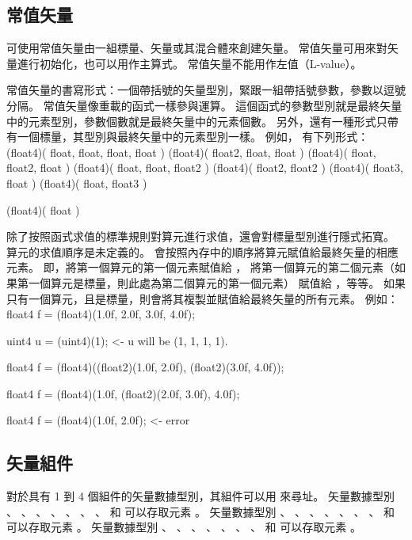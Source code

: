 \subsection{常值矢量}

可使用常值矢量由一組標量、矢量或其混合體來創建矢量。
常值矢量可用來對矢量進行初始化，也可以用作主算式。
常值矢量不能用作左值（L-value）。

常值矢量的書寫形式：一個帶括號的矢量型別，緊跟一組帶括號參數，參數以逗號分隔。
常值矢量像重載的函式一樣參與運算。
這個函式的參數型別就是最終矢量中的元素型別，參數個數就是最終矢量中的元素個數。
另外，還有一種形式只帶有一個標量，其型別與最終矢量中的元素型別一樣。
例如，  有下列形式：
\startclc
(float4)( float, float, float, float )
(float4)( float2, float, float )
(float4)( float, float2, float )
(float4)( float, float, float2 )
(float4)( float2, float2 )
(float4)( float3, float )
(float4)( float, float3 )

(float4)( float )
\stopclc

除了按照函式求值的標準規則對算元進行求值，還會對標量型別進行隱式拓寬。
算元的求值順序是未定義的。
會按照內存中的順序將算元賦值給最終矢量的相應元素。
即，將第一個算元的第一個元素賦值給 ，
將第一個算元的第二個元素（如果第一個算元是標量，則此處為第二個算元的第一個元素）
賦值給 ，等等。
如果只有一個算元，且是標量，則會將其複製並賦值給最終矢量的所有元素。
例如：
\startclc
float4	f = (float4)(1.0f, 2.0f, 3.0f, 4.0f);

uint4	u = (uint4)(1);		<- u will be (1, 1, 1, 1).

float4	f = (float4)((float2)(1.0f, 2.0f),
		     (float2)(3.0f, 4.0f));

float4	f = (float4)(1.0f, (float2)(2.0f, 3.0f), 4.0f);

float4	f = (float4)(1.0f, 2.0f);	<- error
\stopclc

\subsection{矢量組件}

對於具有 1 到 4 個組件的矢量數據型別，其組件可以用  來尋址。
矢量數據型別 、 、 、 、
 、 、 、  和 
 可以存取元素 。
矢量數據型別 、 、 、 、
 、 、 、  和 
 可以存取元素 。
矢量數據型別 、 、 、 、
 、 、 、  和 
 可以存取元素 。

